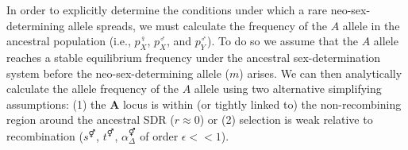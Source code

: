 \documentclass[12pt]{article}
\begin{document}

In order to explicitly determine the conditions under which a rare neo-sex-determining allele spreads, we must calculate the frequency of the $A$ allele in the ancestral population (i.e., $p^\female_X$, $p^\male_X$, and $p^\male_Y$). 
To do so we assume that the $A$ allele reaches a stable equilibrium frequency under the ancestral sex-determination system before the neo-sex-determining allele ($m$) arises. 
We can then analytically calculate the allele frequency of the $A$ allele using two alternative simplifying assumptions: 
(1) the \textbf{A} locus is within (or tightly linked to) the non-recombining region around the ancestral SDR ($r \approx 0$) or (2) selection is weak relative to recombination ($s^\Hermaphrodite$, $t^\Hermaphrodite$, $\alpha_{\Delta}^\Hermaphrodite$ of order $\epsilon<<1$). 
\end{document}
